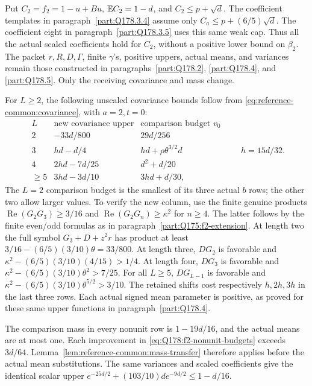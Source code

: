 Put \(C_2=f_2=1-u+Bu\), \(\mathbb E C_2=1-d\), and
\(C_2\le p+\sqrt d\). The coefficient templates in
paragraph~\ref{part:Q178.3.4} assume only
\(C_a\le p+(6/5)\sqrt d\). The coefficient eight in
paragraph~\ref{part:Q178.3.5} uses this same weak cap.
Thus all the actual scaled coefficients hold for \(C_2\),
without a positive lower bound on \(\beta_2\).
The packet \(r,R,D,\Gamma\), finite \(\gamma\)'s, positive
uppers, actual means, and variances remain those constructed
in paragraphs~\ref{part:Q178.2}, \ref{part:Q178.4}, and
\ref{part:Q178.5}. Only the receiving covariance and mass change.

For \(L\ge2\), the following unscaled covariance bounds follow
from \eqref{eq:reference-common:covariance}, with \(a=2,t=0\):
\begin{equation}\label{eq:Q178:f2-nonunit-budgets}
\begin{array}{c|c|c}
L&\text{new covariance upper}&\text{comparison budget }v_0\\\hline
2&-33d/800&29d/256\\
3&hd-d/4&hd+\rho\theta^{3/2}d\\
4&2hd-7d/25&d^2+d/20\\
\ge5&3hd-3d/10&3hd+d/30,
\end{array}
\qquad h=15d/32.
\end{equation}
The \(L=2\) comparison budget is the smallest of its three
actual \(b\) rows; the other two allow larger values.
To verify the new column, use the finite genuine products
\(\operatorname{Re}(G_2G_3)\ge3/16\) and
\(\operatorname{Re}(G_2G_n)\ge\kappa^2\) for \(n\ge4\).
The latter follows by the finite even/odd formulas as in
paragraph~\ref{part:Q175:f2-extension}.
At length two the full symbol \(G_3+D+z^2r\) has product at
least \(3/16-(6/5)(3/10)\theta=33/800\).
At length three, \(DG_2\) is favorable and
\(\kappa^2-(6/5)(3/10)(4/15)>1/4\).
At length four, \(DG_3\) is favorable and
\(\kappa^2-(6/5)(3/10)\theta^2>7/25\).
For all \(L\ge5\), \(DG_{L-1}\) is favorable and
\(\kappa^2-(6/5)(3/10)\theta^{5/2}>3/10\).
The retained shifts cost respectively \(h,2h,3h\) in the last
three rows. Each actual signed mean parameter is positive,
as proved for these same upper functions in paragraph~\ref{part:Q178.4}.

The comparison mass in every nonunit row is \(1-19d/16\),
and the actual means are at most one. Each improvement in
\eqref{eq:Q178:f2-nonunit-budgets} exceeds \(3d/64\).
Lemma~\ref{lem:reference-common:mass-transfer} therefore applies
before the actual mean substitutions. The same variances and
scaled coefficients give the identical scalar upper
\(e^{-25d/2}+(103/10)d e^{-9d/2}\le1-d/16\).


